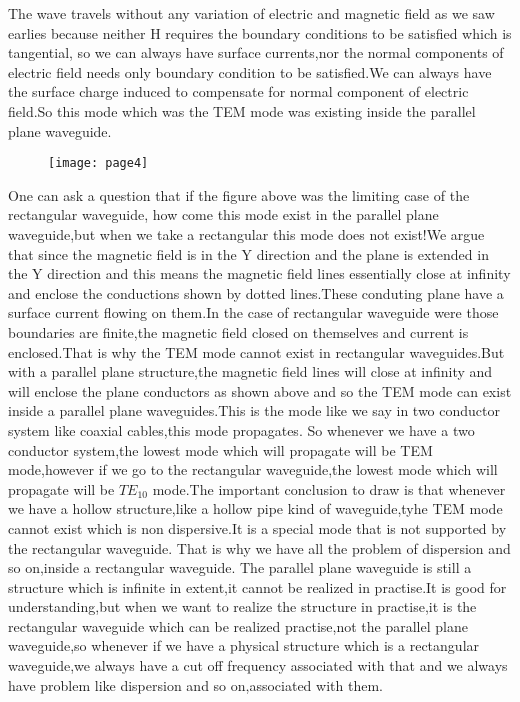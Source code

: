 	The wave travels without any variation of electric and magnetic field as we saw earlies because neither H requires the boundary conditions to be satisfied which is tangential, so we can always have surface currents,nor the normal components of electric field needs only boundary condition to be satisfied.We can always have the surface charge induced to compensate for normal component of electric field.So this mode which was the TEM mode was existing inside the parallel plane waveguide.
		\begin{figure}[h]
		\centering
		\texttt{[image: page4]}
		\caption{}
	\end{figure}
	One can ask a question that if the figure above was the limiting case of the rectangular waveguide, how come this mode exist in the parallel plane waveguide,but when we take a rectangular this mode does not exist!We argue that since the magnetic field is in the Y direction and the plane is extended in the Y direction and this means the magnetic field lines essentially close at infinity and enclose the conductions shown by dotted lines.These conduting plane have a surface current flowing on them.In the case of rectangular waveguide were those boundaries are finite,the magnetic field closed on themselves and current is enclosed.That is why the TEM mode cannot exist in rectangular waveguides.But with a parallel plane structure,the magnetic field lines will close at infinity and will enclose the plane conductors as shown above and so the TEM mode can exist inside a parallel plane waveguides.This is the mode like we say in two conductor system like coaxial cables,this mode propagates.
	So whenever we have a two conductor system,the lowest mode which will propagate will be TEM mode,however if we go to the rectangular waveguide,the lowest mode which will propagate will be ${TE_{10}}$ mode.The important conclusion to draw is that whenever we have a hollow structure,like a hollow pipe kind of waveguide,tyhe TEM mode cannot exist which is non dispersive.It is a special mode that is not supported by the rectangular waveguide. That is why we have all the problem of dispersion and so on,inside a rectangular waveguide. The parallel plane waveguide is still a structure which is infinite in extent,it cannot be realized in practise.It is good for understanding,but when we want to realize the structure in practise,it is the rectangular waveguide which can be realized practise,not the parallel plane waveguide,so whenever if we have a physical structure which is a rectangular waveguide,we always have a cut off frequency associated with that and we always have problem like dispersion and so on,associated with them.
